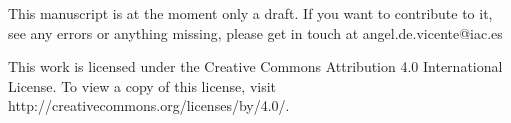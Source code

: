 This manuscript is at the moment only a draft.
If you want to contribute to it, see any errors or anything missing, please get
in touch at angel.de.vicente@iac.es


This work is licensed under the Creative Commons Attribution 4.0 International
License. To view a copy of this license, visit
http://creativecommons.org/licenses/by/4.0/.


